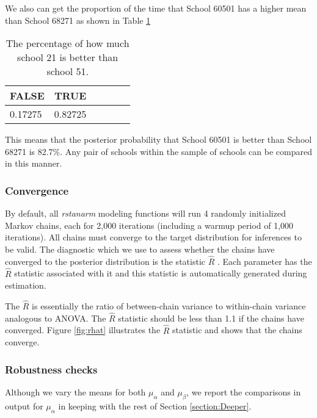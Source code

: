 We also can get the proportion of the time that School 60501 has a higher mean than School 68271 as shown in Table \ref{tab:comparison}

\begin{table}[ht]
	\centering
	\def\arraystretch{1.3}
	{\small
		\begin{tabular}{l | c c c c c}
			FALSE & TRUE \\
			\hline
			0.17275 & 0.82725 
		\end{tabular}
	}
	\caption{{\small The percentage of how much school 21 is better than school 51.}}
	\label{tab:comparison}
\end{table} 

This means that the posterior probability that School 60501 is better than School 68271 is 82.7\%. Any pair of schools within the sample of schools can be compared in this manner.

\subsubsection{Convergence}
By default, all \textit{rstanarm} modeling functions will run 4 randomly initialized Markov chains, each for 2,000 iterations (including a warmup period of 1,000 iterations). All chains must converge to the target distribution for inferences to be valid. The diagnostic which we use to assess whether the chains have converged to the posterior distribution is the statistic $\hat{R}$ \cite{gelman1992inference}. Each parameter has the $\hat{R}$ statistic associated with it and this statistic is automatically generated during estimation.


The $\hat{R}$ is essentially the ratio of between-chain variance to within-chain variance analogous to ANOVA. The $\hat{R}$ statistic should be less than 1.1 if the chains have converged. Figure \ref{fig:rhat} illustrates the $\hat{R}$ statistic and shows that the chains converge.


\subsubsection{Robustness checks}

Although we vary the means for both $\mu_{\alpha}$ and $\mu_{\beta}$, we report the comparisons in output for $\mu_{\alpha}$ in keeping with the rest of Section \ref{section:Deeper}. 

